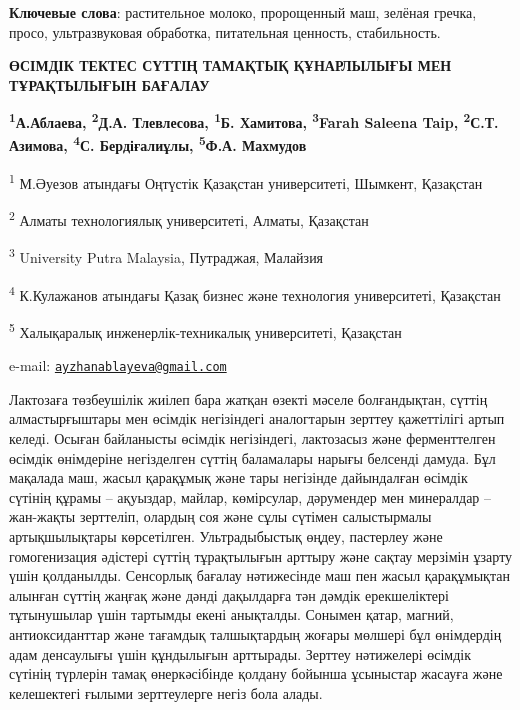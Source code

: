 {\bfseries Ключевые слова}: растительное молоко, пророщенный маш, зелёная
гречка, просо, ультразвуковая обработка, питательная ценность,
стабильность.

\begin{articleheader}
{\bfseries ӨСІМДІК ТЕКТЕС СҮТТІҢ ТАМАҚТЫҚ ҚҰНАРЛЫЛЫҒЫ МЕН ТҰРАҚТЫЛЫҒЫН БАҒАЛАУ}

{\bfseries
\textsuperscript{1}А.Аблаева\textsuperscript{\envelope },
\textsuperscript{2}Д.А. Тлевлесова,
\textsuperscript{1}Б. Хамитова,
\textsuperscript{3}Farah Saleena Taip,
\textsuperscript{2}С.Т. Азимова,
\textsuperscript{4}С. Бердіғалиұлы,
\textsuperscript{5}Ф.А. Махмудов
}
\end{articleheader}

\begin{affiliation}
\textsuperscript{1} М.Әуезов атындағы Оңтүстік Қазақстан университеті, Шымкент, Қазақстан

\textsuperscript{2} Алматы технологиялық университеті, Алматы, Қазақстан

\textsuperscript{3} University Putra Malaysia, Путраджая, Малайзия

\textsuperscript{4} К.Кулажанов атындағы Қазақ бизнес және технология университеті, Қазақстан

\textsuperscript{5} Халықаралық инженерлік-техникалық университеті, Қазақстан

e-mail: \href{mailto:ayzhanablayeva@gmail.com}{\nolinkurl{ayzhanablayeva@gmail.com}}
\end{affiliation}

Лактозаға төзбеушілік жиілеп бара жатқан өзекті мәселе болғандықтан,
сүттің алмастырғыштары мен өсімдік негізіндегі аналогтарын зерттеу
қажеттілігі артып келеді. Осыған байланысты өсімдік негізіндегі,
лактозасыз және ферменттелген өсімдік өнімдеріне негізделген сүттің
баламалары нарығы белсенді дамуда. Бұл мақалада маш, жасыл қарақұмық
және тары негізінде дайындалған өсімдік сүтінің құрамы -- ақуыздар,
майлар, көмірсулар, дәрумендер мен минералдар -- жан-жақты зерттеліп,
олардың соя және сұлы сүтімен салыстырмалы артықшылықтары көрсетілген.
Ультрадыбыстық өңдеу, пастерлеу және гомогенизация әдістері сүттің
тұрақтылығын арттыру және сақтау мерзімін ұзарту үшін қолданылды.
Сенсорлық бағалау нәтижесінде маш пен жасыл қарақұмықтан алынған сүттің
жаңғақ және дәнді дақылдарға тән дәмдік ерекшеліктері тұтынушылар үшін
тартымды екені анықталды. Сонымен қатар, магний, антиоксиданттар және
тағамдық талшықтардың жоғары мөлшері бұл өнімдердің адам денсаулығы үшін
құндылығын арттырады. Зерттеу нәтижелері өсімдік сүтінің түрлерін тамақ
өнеркәсібінде қолдану бойынша ұсыныстар жасауға және келешектегі ғылыми
зерттеулерге негіз бола алады.

